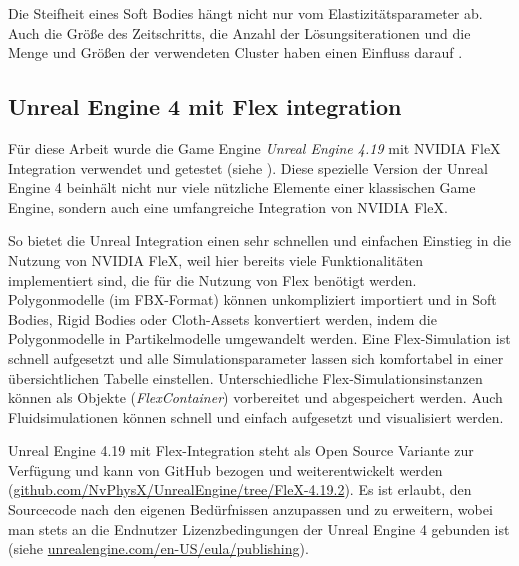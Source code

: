 Die Steifheit eines Soft Bodies hängt nicht nur vom Elastizitätsparameter ab. Auch die Größe des Zeitschritts, die Anzahl der Lösungsiterationen und die Menge und Größen der verwendeten Cluster haben einen Einfluss darauf \cite{PBDKidney}.

\clearpage
{}



\subsection{Unreal Engine 4 mit Flex integration}

Für diese Arbeit wurde die Game Engine \textit{Unreal Engine 4.19} mit NVIDIA FleX Integration verwendet und getestet (siehe \cite{UE4FlexDoc}). Diese spezielle Version der Unreal Engine 4 beinhält nicht nur viele nützliche Elemente einer klassischen Game Engine, sondern auch eine umfangreiche Integration von NVIDIA FleX. 

So bietet die Unreal Integration einen sehr schnellen und einfachen Einstieg in die Nutzung von NVIDIA FleX, weil hier bereits viele Funktionalitäten implementiert sind, die für die Nutzung von Flex benötigt werden. Polygonmodelle (im FBX-Format) können unkompliziert importiert und in Soft Bodies, Rigid Bodies oder Cloth-Assets konvertiert werden, indem die Polygonmodelle in Partikelmodelle umgewandelt werden. Eine Flex-Simulation ist schnell aufgesetzt und alle Simulationsparameter lassen sich komfortabel in einer übersichtlichen Tabelle einstellen. Unterschiedliche Flex-Simulationsinstanzen können als Objekte (\textit{FlexContainer}) vorbereitet und abgespeichert werden. Auch Fluidsimulationen können schnell und einfach aufgesetzt und visualisiert werden.

Unreal Engine 4.19 mit Flex-Integration steht als Open Source Variante zur Verfügung und kann von GitHub bezogen und weiterentwickelt werden (\url{github.com/NvPhysX/UnrealEngine/tree/FleX-4.19.2}). 
Es ist erlaubt, den Sourcecode nach den eigenen Bedürfnissen anzupassen und zu erweitern, wobei man stets an die Endnutzer Lizenzbedingungen der Unreal Engine 4 gebunden ist (siehe \url{unrealengine.com/en-US/eula/publishing}).

